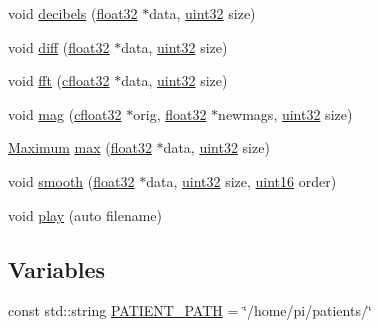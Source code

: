 \begin{DoxyCompactItemize}
\item 
void \hyperlink{namespacevaso_af9bb2211cf3478333dfc1873bf316263}{decibels} (\hyperlink{definitions_8hpp_aacdc525d6f7bddb3ae95d5c311bd06a1}{float32} $\ast$data, \hyperlink{definitions_8hpp_a1134b580f8da4de94ca6b1de4d37975e}{uint32} size)
\item 
void \hyperlink{namespacevaso_a7d108bce812e906d8b1810815774c7ea}{diff} (\hyperlink{definitions_8hpp_aacdc525d6f7bddb3ae95d5c311bd06a1}{float32} $\ast$data, \hyperlink{definitions_8hpp_a1134b580f8da4de94ca6b1de4d37975e}{uint32} size)
\item 
void \hyperlink{namespacevaso_af74f08a8afd7967b6c2b3c2b0e5fb1e9}{fft} (\hyperlink{definitions_8hpp_a960be6b6614c08090c16574dba10a421}{cfloat32} $\ast$data, \hyperlink{definitions_8hpp_a1134b580f8da4de94ca6b1de4d37975e}{uint32} size)
\item 
void \hyperlink{namespacevaso_a5d355b5c326a852e2ce95c258450898c}{mag} (\hyperlink{definitions_8hpp_a960be6b6614c08090c16574dba10a421}{cfloat32} $\ast$orig, \hyperlink{definitions_8hpp_aacdc525d6f7bddb3ae95d5c311bd06a1}{float32} $\ast$newmags, \hyperlink{definitions_8hpp_a1134b580f8da4de94ca6b1de4d37975e}{uint32} size)
\item 
\hyperlink{structMaximum}{Maximum} \hyperlink{namespacevaso_a122846d728be312454a452d379915e10}{max} (\hyperlink{definitions_8hpp_aacdc525d6f7bddb3ae95d5c311bd06a1}{float32} $\ast$data, \hyperlink{definitions_8hpp_a1134b580f8da4de94ca6b1de4d37975e}{uint32} size)
\item 
void \hyperlink{namespacevaso_a5b7fc1a58199e2cac989f417a9faa1ce}{smooth} (\hyperlink{definitions_8hpp_aacdc525d6f7bddb3ae95d5c311bd06a1}{float32} $\ast$data, \hyperlink{definitions_8hpp_a1134b580f8da4de94ca6b1de4d37975e}{uint32} size, \hyperlink{definitions_8hpp_a05f6b0ae8f6a6e135b0e290c25fe0e4e}{uint16} order)
\item 
void \hyperlink{namespacevaso_a7da499b9b1b5a492bea8ab8681e57c22}{play} (auto filename)
\end{DoxyCompactItemize}
\subsection*{Variables}
\begin{DoxyCompactItemize}
\item 
const std\+::string \hyperlink{namespacevaso_a0f49c8240a13e7d853912ad78d5f53c9}{P\+A\+T\+I\+E\+N\+T\+\_\+\+P\+A\+T\+H} = \char`\"{}/home/pi/patients/\char`\"{}
\end{DoxyCompactItemize}


